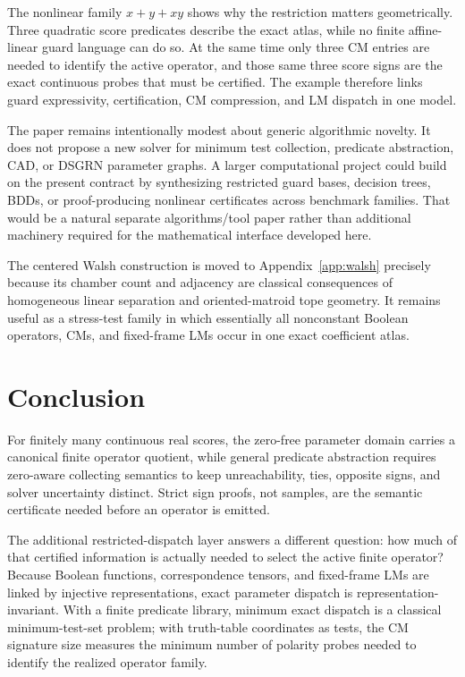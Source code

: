 \documentclass[11pt]{article}
\theoremstyle{definition}
\theoremstyle{remark}
\begin{document}
The nonlinear family $x+y+xy$ shows why the restriction matters geometrically. Three quadratic score predicates describe the exact atlas, while no finite affine-linear guard language can do so. At the same time only three CM entries are needed to identify the active operator, and those same three score signs are the exact continuous probes that must be certified. The example therefore links guard expressivity, certification, CM compression, and LM dispatch in one model.

The paper remains intentionally modest about generic algorithmic novelty. It does not propose a new solver for minimum test collection, predicate abstraction, CAD, or DSGRN parameter graphs. A larger computational project could build on the present contract by synthesizing restricted guard bases, decision trees, BDDs, or proof-producing nonlinear certificates across benchmark families. That would be a natural separate algorithms/tool paper rather than additional machinery required for the mathematical interface developed here.

The centered Walsh construction is moved to Appendix~\ref{app:walsh} precisely because its chamber count and adjacency are classical consequences of homogeneous linear separation and oriented-matroid tope geometry. It remains useful as a stress-test family in which essentially all nonconstant Boolean operators, CMs, and fixed-frame LMs occur in one exact coefficient atlas.

\section{Conclusion}

For finitely many continuous real scores, the zero-free parameter domain carries a canonical finite operator quotient, while general predicate abstraction requires zero-aware collecting semantics to keep unreachability, ties, opposite signs, and solver uncertainty distinct. Strict sign proofs, not samples, are the semantic certificate needed before an operator is emitted.

The additional restricted-dispatch layer answers a different question: how much of that certified information is actually needed to select the active finite operator? Because Boolean functions, correspondence tensors, and fixed-frame LMs are linked by injective representations, exact parameter dispatch is representation-invariant. With a finite predicate library, minimum exact dispatch is a classical minimum-test-set problem; with truth-table coordinates as tests, the CM signature size measures the minimum number of polarity probes needed to identify the realized operator family.
\end{document}
